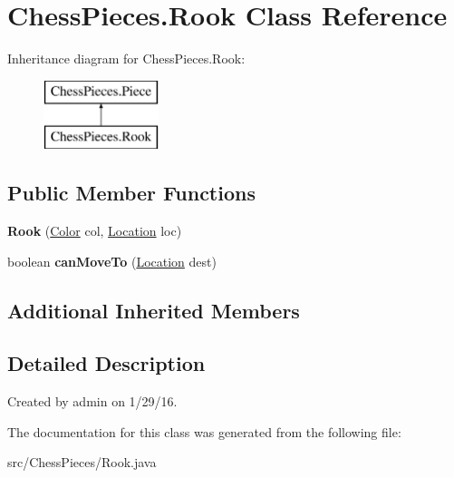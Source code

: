 \hypertarget{class_chess_pieces_1_1_rook}{}\section{Chess\+Pieces.\+Rook Class Reference}
\label{class_chess_pieces_1_1_rook}
Inheritance diagram for Chess\+Pieces.\+Rook\+:\begin{figure}[H]
\begin{center}
\leavevmode
\includegraphics[height=2.000000cm]{class_chess_pieces_1_1_rook}
\end{center}
\end{figure}
\subsection*{Public Member Functions}
\begin{DoxyCompactItemize}
\item 
{\bfseries Rook} (\hyperlink{enum_chess_pieces_1_1_color}{Color} col, \hyperlink{class_chess_pieces_1_1_location}{Location} loc)\hypertarget{class_chess_pieces_1_1_rook_aac17330a776f2de42321192cc08d7ddc}{}\label{class_chess_pieces_1_1_rook_aac17330a776f2de42321192cc08d7ddc}

\item 
boolean {\bfseries can\+Move\+To} (\hyperlink{class_chess_pieces_1_1_location}{Location} dest)\hypertarget{class_chess_pieces_1_1_rook_aa3fc9a4898e072adb1032232a0cdf86d}{}\label{class_chess_pieces_1_1_rook_aa3fc9a4898e072adb1032232a0cdf86d}

\end{DoxyCompactItemize}
\subsection*{Additional Inherited Members}


\subsection{Detailed Description}
Created by admin on 1/29/16. 

The documentation for this class was generated from the following file\+:\begin{DoxyCompactItemize}
\item 
src/\+Chess\+Pieces/Rook.\+java\end{DoxyCompactItemize}
